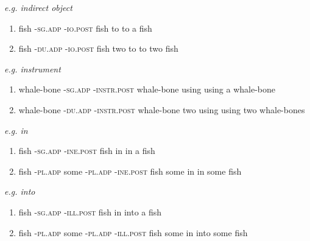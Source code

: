\documentclass{article}
\newcommand{\h}{{$^h$}}
\begin{document}
\textit{e.g. indirect object}
\begin{enumerate}
	\item 
		\trigloss[preamble={\textipa{S:eS:Amat\h{}}}]
		{\textipa{S:eS:} -\textipa{A} -\textipa{mat\h{}} }
		{fish -\textsc{sg.adp} -\textsc{io.post} }
		{fish {} to }
            	{to a fish}
	\item
		\trigloss[preamble={\textipa{S:eS:imat\h{}}}]
		{\textipa{S:eS:} -\textipa{i} -\textipa{mat\h{}} }
		{fish -\textsc{du.adp} -\textsc{io.post} }
		{fish two to }
            	{to two fish}
\end{enumerate}

\textit{e.g. instrument}
\begin{enumerate}
	\item 
		{whale-bone -\textsc{sg.adp} -\textsc{instr.post} }
		{whale-bone {} using }
            	{using a whale-bone}
	\item
		{whale-bone -\textsc{du.adp} -\textsc{instr.post} }
		{whale-bone two using }
            	{using two whale-bones}

\end{enumerate}

\textit{e.g. in}
\begin{enumerate}
	\item 
		{fish -\textsc{sg.adp} -\textsc{ine.post} }
		{fish {} in }
            	{in a fish}
	\item
		{fish -\textsc{pl.adp} some -\textsc{pl.adp} -\textsc{ine.post} }
		{fish {} some {} in }
            	{in some fish}

\end{enumerate}

\textit{e.g. into}
\begin{enumerate}
	\item 
		{fish -\textsc{sg.adp} -\textsc{ill.post} }
		{fish {} in }
            	{into a fish}
	\item
		{fish -\textsc{pl.adp} some -\textsc{pl.adp} -\textsc{ill.post} }
		{fish {} some {} in }
            	{into some fish}

\end{enumerate}
\end{document}

